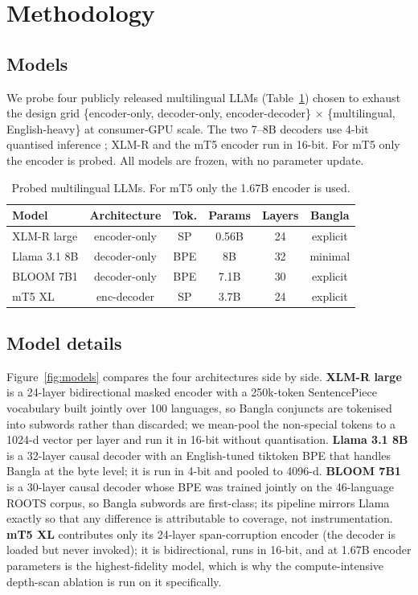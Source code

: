 \documentclass[conference]{IEEEtran}
\begin{document}
\section{Methodology}
\subsection{Models}
We probe four publicly released multilingual LLMs (Table~\ref{tab:models}) chosen to exhaust the design grid \{encoder-only, decoder-only, encoder-decoder\} $\times$ \{multilingual, English-heavy\} at consumer-GPU scale. The two 7--8B decoders use 4-bit quantised inference \cite{dettmers2022bnb}; XLM-R and the mT5 encoder run in 16-bit. For mT5 only the encoder is probed. All models are frozen, with no parameter update.

\begin{table}[t]
\caption{Probed multilingual LLMs. For mT5 only the 1.67B encoder is used.}
\label{tab:models}
\centering
\small
\setlength{\tabcolsep}{4pt}
\begin{tabular}{lccccc}
\toprule
\textbf{Model} & \textbf{Architecture} & \textbf{Tok.} & \textbf{Params} & \textbf{Layers} & \textbf{Bangla} \\
\midrule
XLM-R large  & encoder-only    & SP   & 0.56B & 24 & explicit \\
Llama 3.1 8B & decoder-only    & BPE  & 8B    & 32 & minimal \\
BLOOM 7B1    & decoder-only    & BPE  & 7.1B  & 30 & explicit \\
mT5 XL       & enc-decoder     & SP   & 3.7B  & 24 & explicit \\
\bottomrule
\end{tabular}
\end{table}

\subsection{Model details}
Figure~\ref{fig:models} compares the four architectures side by side. \textbf{XLM-R large} is a 24-layer bidirectional masked encoder with a 250k-token SentencePiece vocabulary built jointly over 100 languages, so Bangla conjuncts are tokenised into subwords rather than discarded; we mean-pool the non-special tokens to a 1024-d vector per layer and run it in 16-bit without quantisation. \textbf{Llama 3.1 8B} is a 32-layer causal decoder with an English-tuned tiktoken BPE that handles Bangla at the byte level; it is run in 4-bit and pooled to 4096-d. \textbf{BLOOM 7B1} is a 30-layer causal decoder whose BPE was trained jointly on the 46-language ROOTS corpus, so Bangla subwords are first-class; its pipeline mirrors Llama exactly so that any difference is attributable to coverage, not instrumentation. \textbf{mT5 XL} contributes only its 24-layer span-corruption encoder (the decoder is loaded but never invoked); it is bidirectional, runs in 16-bit, and at 1.67B encoder parameters is the highest-fidelity model, which is why the compute-intensive depth-scan ablation is run on it specifically.
\end{document}
